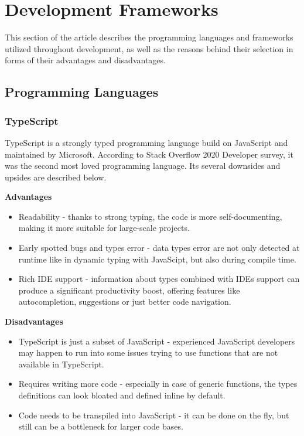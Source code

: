 \chapter{Development Frameworks} \label{ch:development_frameworks}

This section of the article describes the programming languages and frameworks utilized throughout development, as well as the reasons behind their selection in forms of their advantages and disadvantages.

\section{Programming Languages}

\subsection{TypeScript}
TypeScript\cite{type_script} is a strongly typed programming language build on JavaScript and maintained by Microsoft. According to Stack Overflow 2020 Developer survey, it was the second most loved programming language. Its several downsides and upsides are described below.

\textbf{Advantages}
\begin{itemize}
    \item Readability - thanks to strong typing, the code is more self-documenting, making it more suitable for large-scale projects.
    \item Early spotted bugs and types error - data types error are not only detected at runtime like in dynamic typing with JavaScipt, but also during compile time.
    \item Rich IDE support - information about types combined with IDEs support can produce a significant productivity boost, offering features like autocompletion, suggestions or just better code navigation.
\end{itemize}

\textbf{Disadvantages}
\begin{itemize}
    \item TypeScript is just a subset of JavaScript - experienced JavaScript developers may happen to run into some issues trying to use functions that are not available in TypeScript.
    \item Requires writing more code - especially in case of generic functions, the types definitions can look bloated and defined inline by default.
    \item Code needs to be transpiled into JavaScript - it can be done on the fly, but still can be a bottleneck for larger code bases.
\end{itemize}

